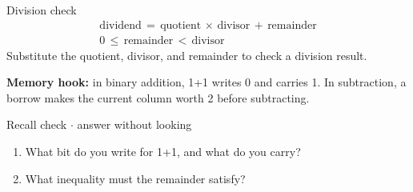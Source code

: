 \documentclass[11pt]{article}
\begin{document}
\begin{keepsection}
\begin{keepsection}
\begin{equationcard}{Division check}
\[ \begin{gathered} \text{dividend}\, =\, \text{quotient}\, \times \, \text{divisor}\, +\, \text{remainder} \\ 0\, \leq \, \text{remainder}\, <\, \text{divisor} \end{gathered} \]
{\small Substitute the quotient, divisor, and remainder to check a division result.}
\end{equationcard}

\begin{notebox}\textbf{Memory hook:} in binary addition, 1+1 writes 0 and carries 1. In subtraction, a borrow makes the current column worth 2 before subtracting.\end{notebox}

\begin{recallbox}{Recall check \ensuremath{\cdot} answer without looking}
\begin{enumerate}
\item What bit do you write for 1+1, and what do you carry?
\item What inequality must the remainder satisfy?
\end{enumerate}

\end{recallbox}
\end{keepsection}
\end{keepsection}
\end{document}
